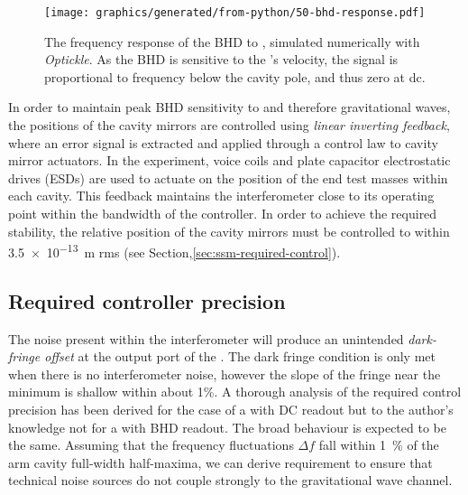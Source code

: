 \begin{figure}
  \centering
  \texttt{[image: graphics/generated/from-python/50-bhd-response.pdf]}
  \caption[The frequency response of the differential arm cavity degree of freedom to the balanced homodyne readout]{\label{fig:bhd-response}The frequency response of the BHD to \LMINUS{}, simulated numerically with \emph{Optickle}. As the BHD is sensitive to the \SSM{}'s velocity, the signal is proportional to frequency below the cavity pole, and thus zero at dc.}
\end{figure}

In order to maintain peak \gls{BHD} sensitivity to \LMINUS{} and therefore gravitational waves, the positions of the cavity mirrors are controlled using \emph{linear inverting feedback}, where an error signal is extracted and applied through a control law to cavity mirror actuators. In the experiment, voice coils and plate capacitor electrostatic drives (\glspl{ESD}) \cite{Wittel2015} are used to actuate on the position of the end test masses within each cavity. This feedback maintains the interferometer close to its operating point within the bandwidth of the controller. In order to achieve the required stability, the relative position of the cavity mirrors must be controlled to within \SI{3.5e-13}{\meter} rms (see Section,\ref{sec:ssm-required-control}).
   

\subsection{\label{sec:ssm-required-control}Required controller precision}

The noise present within the interferometer will produce an unintended \emph{dark-fringe offset} at the output port of the \SSM{}. The dark fringe condition is only met when there is no interferometer noise, however the slope of the fringe near the minimum is shallow within about 1\%. A thorough analysis of the required control precision has been derived for the case of a \DRFPMI{} with \gls{DC} readout \cite{Vajente2011} but to the author's knowledge not for a \SSM{} with \gls{BHD} readout. The broad behaviour is expected to be the same. Assuming that the frequency fluctuations $\Delta f$ fall within \SI{1}{\percent} of the arm cavity full-width half-maxima, we can derive  requirement to ensure that technical noise sources do not couple strongly to the gravitational wave channel.

